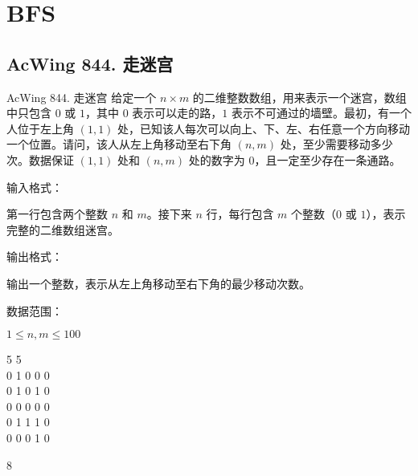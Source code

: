 \section{BFS}
\subsection{AcWing 844. 走迷宫}
\begin{titledbox}{AcWing 844. 走迷宫}
给定一个 $n \times m$ 的二维整数数组，用来表示一个迷宫，数组中只包含 $0$ 或 $1$，其中 $0$ 表示可以走的路，$1$ 表示不可通过的墙壁。最初，有一个人位于左上角 $(1, 1)$ 处，已知该人每次可以向上、下、左、右任意一个方向移动一个位置。请问，该人从左上角移动至右下角 $(n, m)$ 处，至少需要移动多少次。数据保证 $(1, 1)$ 处和 $(n, m)$ 处的数字为 $0$，且一定至少存在一条通路。

输入格式：

第一行包含两个整数 $n$ 和 $m$。接下来 $n$ 行，每行包含 $m$ 个整数（$0$ 或 $1$），表示完整的二维数组迷宫。

输出格式：

输出一个整数，表示从左上角移动至右下角的最少移动次数。

数据范围：

$1 \le n, m \le 100$

\begin{inputblock}
    5 5 \\
    0 1 0 0 0 \\
    0 1 0 1 0 \\
    0 0 0 0 0 \\
    0 1 1 1 0 \\
    0 0 0 1 0
\end{inputblock}
\begin{outputblock}
    8
\end{outputblock}
\end{titledbox}

